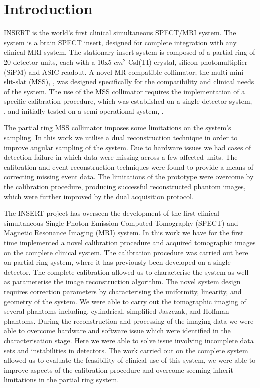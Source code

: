 \section{Introduction}

INSERT is the world's first clinical simultaneous SPECT/MRI system. The system is a brain SPECT insert, designed for complete integration with any clinical MRI system. The stationary insert system is composed of a partial ring of 20 detector units, each with a 10x5 $cm^2$ CsI(TI) crystal, silicon photomultiplier (SiPM) and ASIC readout. A novel MR compatible collimator; the multi-mini-slit-slat (MSS), \cite{7430894}, was designed specifically for the compatibility and clinical needs of the system. The use of the MSS collimator requires the implementation of a specific calibration procedure, which was established on a single detector system, \cite{8340862}, and initially tested on a semi-operational system, \cite{inproceedings}.

The partial ring MSS collimator imposes some limitations on the system's sampling. In this work we utilise a dual reconstruction technique in order to improve angular sampling of the system. Due to hardware issues we had cases of detection failure in which data were missing across a few affected units. The calibration and event reconstruction techniques were found to provide a means of correcting missing event data. The limitations of the prototype were overcome by the calibration procedure, producing successful reconstructed phantom images, which were further improved by the dual acquisition protocol.   

The INSERT project has overseen the development
of the first clinical simultaneous Single Photon Emission Computed
Tomography (SPECT) and Magnetic Resonance Imaging
(MRI) system. In this work we have for the first time implemented
a novel calibration procedure and acquired tomographic images
on the complete clinical system. The calibration procedure was
carried out here on partial ring system, where it has previously
been developed on a single detector. The complete calibration
allowed us to characterise the system as well as parameterise
the image reconstruction algorithm. The novel system design
requires correction parameters by characterising the uniformity,
linearity, and geometry of the system. We were able to carry
out the tomographic imaging of several phantoms including,
cylindrical, simplified Jaszczak, and Hoffman phantoms. During
the reconstruction and processing of the imaging data we were
able to overcome hardware and software issue which were
identified in the characterisation stage. Here we were able to
solve issue involving incomplete data sets and instabilities in
detectors. The work carried out on the complete system allowed
us to evaluate the feasibility of clinical use of this system, we
were able to improve aspects of the calibration procedure and
overcome seeming inherit limitations in the partial ring system.

